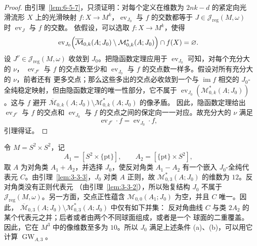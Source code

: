 \begin{proof}
由引理~\ref{lem:6-5-7}，只须证明：对每个定义在维数为 $2nk-d$ 的紧定向光滑流形 $X$
上的光滑映射 $f:X\to M^k$，$\operatorname{ev}_{J_0}$ 与 $f$ 的交数都等于
$J\in\mathcal J_{\mathrm{reg}}(M,\omega)$ 时 $\operatorname{ev}_J$ 与 $f$ 的交数。
依假设，可以选取 $f:X\to M^k$，使得
\[
  \operatorname{ev}_{J_0}\Bigl(
  \overline{\mathcal M}_{0,k}(A;J_0)
  \setminus\mathcal M^*_{0,k}(A;J_0)\Bigr)
  \cap f(X)=\varnothing.
\]
设 $J^\nu\in\mathcal J_{\mathrm{reg}}(M,\omega)$ 收敛到 $J_0$。把隐函数定理应用于
$\operatorname{ev}_{J_0}$ 可知，对每个充分大的 $\nu$，
$\operatorname{ev}_{J^\nu}$ 与 $f$ 的交点数至少和
$\operatorname{ev}_{J_0}$ 与 $f$ 的交点数一样多。假设对所有充分大的 $\nu$，前者还有
更多交点；那么这些多出的交点必收敛到一个与 $\operatorname{im}f$ 相交的
$J_0$-全纯稳定映射，但由隐函数定理的唯一性部分，它不属于
$\operatorname{ev}_{J_0}(\mathcal M^*_{0,k}(A;J_0))$。这与 $f$ 避开
$\overline{\mathcal M}_{0,k}(A;J_0)\setminus\mathcal M^*_{0,k}(A;J_0)$ 的像矛盾。
因此，隐函数定理给出 $\operatorname{ev}_{J^\nu}$ 与 $f$ 的交点和
$\operatorname{ev}_{J_0}$ 与 $f$ 的交点之间的保定向一一对应。故充分大的 $\nu$ 满足
\[
  \operatorname{ev}_{J^\nu}\cdot f=\operatorname{ev}_{J_0}\cdot f,
\]
引理得证。
\end{proof}

\begin{example}\label{ex:7-2-2}
令 $M=S^2\times S^2$，记
\[
  A_1=[S^2\times\{\mathrm{pt}\}],
  \qquad
  A_2=[\{\mathrm{pt}\}\times S^2],
\]
取 $A$ 为对角类 $A_1+A_2$，并选择 $J_0$，使反对角类 $A_1-A_2$ 有一个嵌入
$J_0$-全纯代表元 $C$。由引理~\ref{lem:3-3-3}，$J_0$ 对类 $A$ 正则，故
$\mathcal M^*_{0,3}(A;J_0)$ 的维数为 $12$。反对角类没有正则代表元
（由引理~\ref{lem:3-3-2}），所以殆复结构 $J_0$ 不属于
$\mathcal J_{\mathrm{reg}}(M,\omega)$。另一方面，交点正性蕴含
$\mathcal M_{0,0}(A_1;J_0)$ 为空，并且 $C$ 唯一。因此，
$\overline{\mathcal M}_{0,3}(A;J_0)\setminus\mathcal M^*_{0,3}(A;J_0)$ 中仅有如下并集：
反对角曲线 $C$ 与类 $2A_2$ 的某个代表元之并；后者或者由两个不同球面组成，或者是一个
球面的二重覆盖。因此，它在 $M^3$ 中的像维数至多为 $10$。所以 $J_0$ 满足上述条件
(a)、(b)，可以用它计算 $\operatorname{GW}_{A,3}$。
\end{example}

